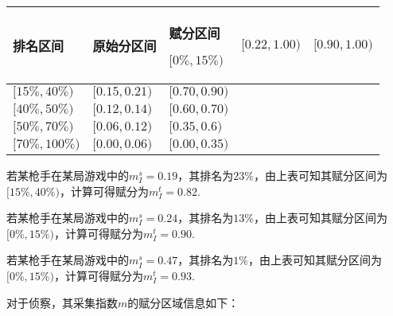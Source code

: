 \documentclass{ctexart}
\begin{document}
\begin{longtable}{|>{\centering\arraybackslash}p{6em}|>{\centering\arraybackslash}p{6em}|>{\centering\arraybackslash}p{6em}|}
    \hline

    排名区间             & 原始分区间  & 赋分区间     \endhead

    \hline

    $[0\%, 15\%)$ & $[0.22, 1.00)$  & $[0.90, 1.00)$          \\

    \hline

    $[15\%, 40\%)$  & $[0.15, 0.21)$ & $[0.70, 0.90)$          \\

    \hline

    $[40\%, 50\%)$   & $[0.12, 0.14)$ & $[0.60, 0.70)$          \\

    \hline

    $[50\%, 70\%)$    & $[0.06, 0.12)$ & $[0.35, 0.6)$          \\

    \hline

    $[70\%, 100\%)$    & $[0.00, 0.06)$ & $[0.00, 0.35)$          \\

    \hline

\end{longtable}

若某枪手在某局游戏中的$m_I^s = 0.19$，其排名为$23\%$，由上表可知其赋分区间为$[15\%, 40\%)$，计算可得赋分为$m_I^t = 0.82$.

若某枪手在某局游戏中的$m_I^s = 0.24$，其排名为$13\%$，由上表可知其赋分区间为$[0\%, 15\%)$，计算可得赋分为$m_I^t = 0.90$.

若某枪手在某局游戏中的$m_I^s = 0.47$，其排名为$1\%$，由上表可知其赋分区间为$[0\%, 15\%)$，计算可得赋分为$m_I^t = 0.93$.

对于侦察，其采集指数$m$的赋分区域信息如下：
\end{document}
